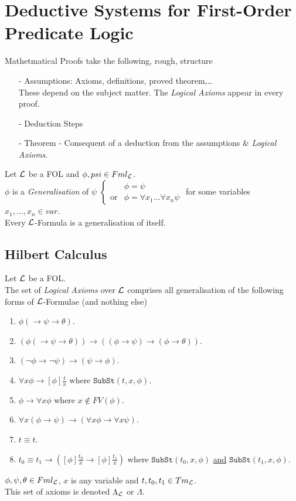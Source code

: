\documentclass[11pt,a4paper]{article}
\begin{document}

\section{Deductive Systems for First-Order Predicate Logic}

Mathetmatical Proofs take the following, rough, structure
\begin{itemize}
	\item[-] Assumptions: Axioms, definitions, proved theorem,\dots\\
	\nb These depend on the subject matter. The \textit{Logical Axioms} appear in every proof.
	\item[-] Deduction Steps
	\item[-] Theorem - Consequent of a deduction from the assumptions \& \textit{Logical Axioms}.
\end{itemize}

Let $\mathcal{L}$ be a FOL and $\phi,psi\in Fml_{\mathcal{L}}$.\\
$\phi$ is a \textit{Generalisation} of $\psi$ $\begin{cases}&\phi=\psi\\\text{or}&\phi=\forall x_1\dots\forall x_n\psi\end{cases}$ for some variables $x_1,\dots,x_n\in var$.\\
\nb Every $\mathcal{L}$-Formula is a generalisation of itself.\\

\subsection{Hilbert Calculus}

Let $\mathcal{L}$ be a FOL.\\
The set of \textit{Logical Axioms} over $\mathcal{L}$ comprises all generalisation of the following forms of $\mathcal{L}$-Formulae (and nothing else)
\begin{enumerate}
	\item $\phi(\to\psi\to\theta)$.
	\item $(\phi(\to\psi\to\theta))\to((\phi\to\psi)\to(\phi\to\theta))$.
	\item $(\neg\phi\to\neg\psi)\to(\psi\to\phi)$.
	\item $\forall x\phi\to[\phi]\frac{t}{x}$ where $\mathtt{SubSt}(t,x,\phi)$.
	\item $\phi\to\forall x\phi$ where $x\not\in FV(\phi)$.
	\item $\forall x(\phi\to\psi)\to(\forall x\phi\to\forall x\psi)$.
	\item $t\equiv t$.
	\item $t_0\equiv t_1\to\left([\phi]\frac{t_0}x\to[\phi]\frac{t_1}x\right)$ where $\mathtt{SubSt}(t_0,x,\phi)$ \underline{and} $\mathtt{SubSt}(t_1,x,\phi)$.
\end{enumerate}
\nb $\phi,\psi,\theta\in Fml_{\mathcal{L}}$, $x$ is any variable and $t,t_0,t_1\in Tm_{\mathcal{L}}$.\\
\nb This set of axioms is denoted $\Lambda_{\mathcal{L}}$ or $\Lambda$.\\
\end{document}
